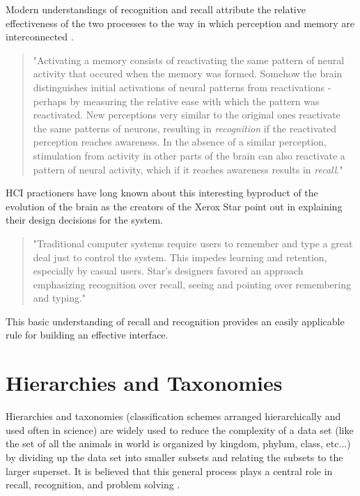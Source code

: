 Modern understandings of recognition and recall attribute the relative effectiveness of the two processes to the way in which perception and memory are interconnected \cite{mindinmind2010}.

\begin{quote}
"Activating a memory consists of reactivating the same pattern of neural activity that occured when the memory was formed. Somehow the brain distinguishes initial activations of neural patterns from reactivations - perhaps by measuring the relative ease with which the pattern was reactivated. New perceptions very similar to the original ones reactivate the same patterns of neurons, resulting in \emph{recognition} if the reactivated perception reaches awareness. In the absence of a similar perception, stimulation from activity in other parts of the brain can also reactivate a pattern of neural activity, which if it reaches awareness results in \emph{recall}." \cite{mindinmind2010}
\end{quote}

HCI practioners have long known about this interesting byproduct of the evolution of the brain as the creators of the Xerox Star point out in explaining their design decisions for the system.

\begin{quote}
"Traditional computer systems require users to remember and type a great deal just to control the system. This impedes learning and retention, especially by casual users. Star's designers favored an approach emphasizing recognition over recall, seeing and pointing over remembering and typing." \cite{xeroxstar1989}
\end{quote}

This basic understanding of recall and recognition provides an easily applicable rule for building an effective interface.

\section{Hierarchies and Taxonomies}

\begin{comment}
Papers:
Magic number seven, George Miller
recoding pg. 93
increasing bits per chunk
The Structure of the Information Visualization Design Space, Section 2
enclosure
Coding Recoding Hierarchical Information
Acquisiton and forgetting of hierarchically organized information
\end{comment}

Hierarchies and taxonomies (classification schemes arranged hierarchically and used often in science) are widely used to reduce the complexity of a data set (like the set of all the animals in world is organized by kingdom, phylum, class, etc...) by dividing up the data set into smaller subsets and relating the subsets to the larger superset. It is believed that this general process plays a central role in recall, recognition, and problem solving \cite{seven1956}\cite{graphicalhierarchy1972}\cite{hierarchical1971}. 

